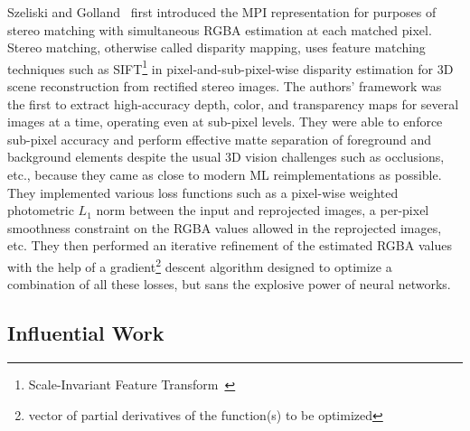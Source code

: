 Szeliski and Golland~\cite{szeliski_stereo_1999} first introduced the MPI representation for purposes of stereo matching with simultaneous RGBA estimation at each matched pixel. Stereo matching, otherwise called disparity mapping, uses feature matching techniques such as SIFT\footnote{Scale-Invariant Feature Transform~\cite{lowe_distinctive_2004}} in pixel-and-sub-pixel-wise disparity estimation for 3D scene reconstruction from rectified stereo images. The authors' framework was the first to extract high-accuracy depth, color, and transparency maps for several images at a time, operating even at sub-pixel levels. They were able to enforce sub-pixel accuracy and perform effective matte separation of foreground and background elements despite the usual 3D vision challenges such as occlusions, etc., because they came as close to modern ML reimplementations as possible. They implemented various loss functions such as a pixel-wise weighted photometric $L_1$ norm between the input and reprojected images, a per-pixel smoothness constraint on the RGBA values allowed in the reprojected images, etc. They then performed an iterative refinement of the estimated RGBA values with the help of a gradient\footnote{vector of partial derivatives of the function(s) to be optimized} descent algorithm designed to optimize a combination of all these losses, but sans the explosive power of neural networks.

\subsection{Influential Work}\label{subsec:influential-work}

